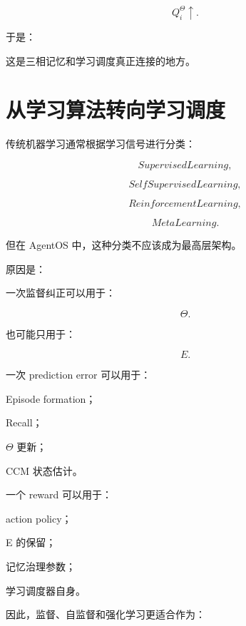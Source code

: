 \[
Q_i^\Theta\uparrow.
\]

于是：

\begin{statementbox}
\centering
{}
\end{statementbox}

这是三相记忆和学习调度真正连接的地方。


\section{从学习算法转向学习调度}

传统机器学习通常根据学习信号进行分类：

\[
SupervisedLearning,
\]

\[
SelfSupervisedLearning,
\]

\[
ReinforcementLearning,
\]

\[
MetaLearning.
\]

但在 AgentOS 中，这种分类不应该成为最高层架构。

原因是：

\begin{statementbox}
\centering
{}
\end{statementbox}

一次监督纠正可以用于：

\[
\Theta.
\]

也可能只用于：

\[
E.
\]

一次 prediction error 可以用于：

Episode formation；

Recall；

\(\Theta\) 更新；

CCM 状态估计。

一个 reward 可以用于：

action policy；

E 的保留；

记忆治理参数；

学习调度器自身。

因此，监督、自监督和强化学习更适合作为：

\begin{statementbox}
\centering
{}
\end{statementbox}

